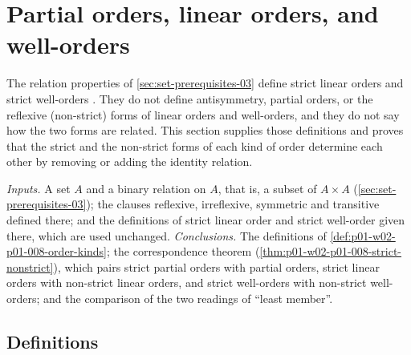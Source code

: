 \section{Partial orders, linear orders, and well-orders}
\label{sec:p01-w02-p01-008-orders}

The relation properties of \cref{sec:set-prerequisites-03} define strict
linear orders and strict well-orders \cite[ch.~``Sets, Relations, Functions,
and Cardinality'', sec.~``Relations and functions'', definition ``Properties
of a binary relation'']{FrozenFormalLogicOrdersChoice}. They do not define
antisymmetry, partial orders, or the reflexive (non-strict) forms of linear
orders and well-orders, and they do not say how the two forms are related.
This section supplies those definitions and proves that the strict and the
non-strict forms of each kind of order determine each other by removing or
adding the identity relation.

\emph{Inputs.} A set \(A\) and a binary relation on \(A\), that is, a subset
of \(A\times A\) (\cref{sec:set-prerequisites-03}); the clauses reflexive,
irreflexive, symmetric and transitive defined there; and the definitions of
strict linear order and strict well-order given there, which are used
unchanged. \emph{Conclusions.} The definitions of
\cref{def:p01-w02-p01-008-order-kinds}; the correspondence theorem
(\cref{thm:p01-w02-p01-008-strict-nonstrict}), which pairs strict partial
orders with partial orders, strict linear orders with non-strict linear
orders, and strict well-orders with non-strict well-orders; and the
comparison of the two readings of ``least member''.

\subsection{Definitions}
\label{sec:p01-w02-p01-008-order-defs}

